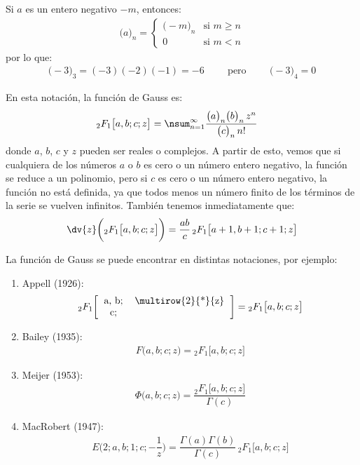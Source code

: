 Si $a$ es un entero negativo $-m$, entonces:
\begin{align*}
\big( a \big)_{n} = \begin{cases}
\big( -m \big)_{n} & \mbox{si } m \geq n \\
0 & \mbox{si } m < n
\end{cases}
\end{align*}
por lo que:
\begin{align*}
\big( -3 \big)_{3} = (-3)(-2)(-1) = -6 \hspace{1cm} \mbox{pero} \hspace{1cm} \big( -3 \big)_{4} = 0
\end{align*}

En esta notación, la función de Gauss es:
\begin{align}
{}_{2} &F_{1} \big[ a, b; c; z \big] = \nsum_{n=1}^{\infty} \dfrac{\big( a \big)_{n} \big( b \big)_{n} \, z^{n}}{\big( c \big)_{n} \, n!}
\label{eq:ecuacion_01_01_01_04}
\end{align}
donde $a$, $b$, $c$ y $z$ pueden ser reales o complejos. A partir de esto, vemos que si cualquiera de los números $a$ o $b$ es cero o un número entero negativo, la función se reduce a un polinomio, pero si $c$ es cero o un número entero negativo, la función no está definida, ya que todos menos un número finito de los términos de la serie se vuelven infinitos. También tenemos inmediatamente que:
\begin{align}
\dv{z} \bigg( {}_{2} F_{1} \big[ a, b; c; z \big] \bigg) = \dfrac{a b}{c} \, {}_{2} F_{1} \big[ a + 1, b + 1; c + 1; z \big]
\label{eq:ecuacion_01_01_01_05}
\end{align}

La función de Gauss se puede encontrar en distintas notaciones, por ejemplo:
\begin{enumerate}[label=\alph*)]
\item Appell (1926):
\begin{align}
{}_{2} F_{1} \bigg[
\begin{tabular}{c c}
a, b; & \multirow{2}{*}{z} \\
c; &
\end{tabular} \bigg] = {}_{2} F_{1} \big[ a, b; c; z \big]
\label{eq:ecuacion_01_01_01_06}
\end{align}
\item Bailey (1935):
\begin{align}
F \big( a, b; c; z \big) = {}_{2} F_{1} \big[ a, b; c; z \big]
\label{eq:ecuacion_01_01_01_07}
\end{align}
\item Meijer (1953):
\begin{align}
\Phi \big( a, b; c; z \big) = \dfrac{{}_{2} F_{1} \big[ a, b; c; z \big]}{\Gamma (c)}
\label{eq:ecuacion_01_01_01_08}
\end{align}
\item MacRobert (1947):
\begin{align}
E \big( 2; a, b; 1; c; -\dfrac{1}{z} \big) = \dfrac{\Gamma (a) \Gamma (b)}{\Gamma (c)} \, {}_{2} F_{1} \big[ a, b; c; z \big]
\label{eq:ecuacion_01_01_01_9}
\end{align}
\end{enumerate}

